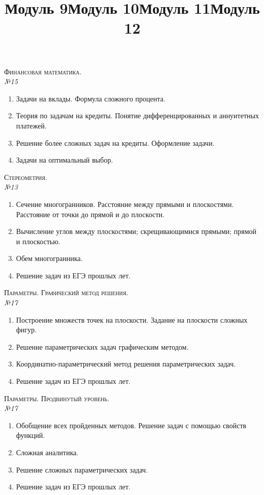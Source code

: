 \documentclass[12pt, a4paper]{article}
\begin{document}
\newpage
\title{Модуль 9}
\textsc{Финансовая математика.}\\[0.5em]
\textit{№15}
\begin{enumerate}[label=\textbf{\arabic*})]
	\item Задачи на вклады. Формула сложного процента.
	\item Теория по задачам на кредиты. Понятие дифференцированных и аннуитетных платежей.
	\item Решение более сложных задач на кредиты. Оформление задачи.
	\item Задачи на оптимальный выбор.
\end{enumerate}
\title{Модуль 10}
\textsc{Стереометрия.}\\[0.5em]
\textit{№13}
\begin{enumerate}[label=\textbf{\arabic*})]
	\item Сечение многогранников. Расстояние между прямыми и плоскостями. Расстояние от точки до прямой и до плоскости.
	\item Вычисление углов между плоскостями; скрещивающимися прямыми; прямой и плоскостью.
	\item Обем многогранника.
	\item Решение задач из ЕГЭ прошлых лет.
\end{enumerate}
\title{Модуль 11}
\textsc{Параметры. Графический метод решения.}\\[0.5em]
\textit{№17}
\begin{enumerate}[label=\textbf{\arabic*})]
	\item Построение множеств точек на плоскости. Задание на плоскости сложных фигур.
	\item Решение параметрических задач графическим методом.
	\item Координатно-параметрический метод решения параметрических задач.
	\item Решение задач из ЕГЭ прошлых лет.
\end{enumerate}
\title{Модуль 12}
\textsc{Параметры. Продвинутый уровень.}\\[0.5em]
\textit{№17}
\begin{enumerate}[label=\textbf{\arabic*})]
	\item Обобщение всех пройденных методов. Решение задач с помощью свойств функций.
	\item Сложная аналитика.
	\item Решение сложных параметрических задач.
	\item Решение задач из ЕГЭ прошлых лет.
\end{enumerate}
\end{document}
